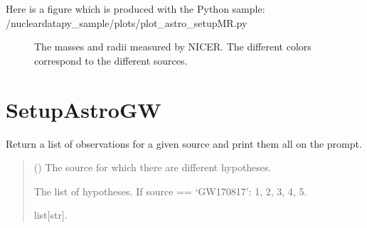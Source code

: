 \documentclass[letterpaper,10pt,english]{sphinxmanual}
\begin{document}
\sphinxAtStartPar
Here is a figure which is produced with the Python sample: /nucleardatapy\_sample/plots/plot\_astro\_setupMR.py

\begin{figure}[htbp]
\centering
\capstart

\noindent{}
\caption{The masses and radii measured by NICER. The different colors correspond to the different sources.}\label{\detokenize{source/api/setup_astro_mr:id1}}\end{figure}

\sphinxstepscope


\section{SetupAstroGW}
\label{\detokenize{source/api/setup_astro_gw:setupastrogw}}\label{\detokenize{source/api/setup_astro_gw::doc}}\label{\detokenize{source/api/setup_astro_gw:module-nucleardatapy.astro.setup_gw}}

\begin{fulllineitems}
\label{\detokenize{source/api/setup_astro_gw:nucleardatapy.astro.setup_gw.gw_hyps}}
\pysigstartsignatures
{}
\pysigstopsignatures
\sphinxAtStartPar
Return a list of observations for a given source and print them all on the prompt.
\begin{quote}\begin{description}
\sphinxAtStartPar
{} () \textendash{} The source for which there are different hypotheses.

\sphinxAtStartPar
The list of hypotheses.     If source == ‘GW170817’: 1, 2, 3, 4, 5.

\sphinxAtStartPar
list{[}str{]}.

\end{description}\end{quote}

\end{fulllineitems}
\end{document}
